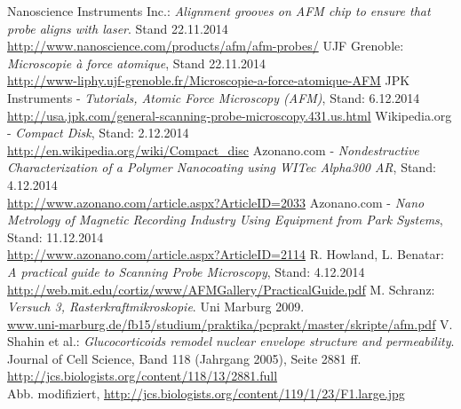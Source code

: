 \documentclass[a4paper, parskip=half, 12pt, bibliography=totocnumbered]{scrartcl}
\begin{document}





\begin{thebibliography}{10}
 Nanoscience Instruments Inc.: \emph{Alignment grooves on AFM chip to ensure that probe aligns with laser}. Stand 22.11.2014\\
\url{http://www.nanoscience.com/products/afm/afm-probes/}
 UJF Grenoble: \emph{Microscopie à force atomique}, Stand 22.11.2014\\
\url{http://www-liphy.ujf-grenoble.fr/Microscopie-a-force-atomique-AFM}
 JPK Instruments - \emph{Tutorials, Atomic Force Microscopy (AFM)}, Stand: 6.12.2014\\
\url{http://usa.jpk.com/general-scanning-probe-microscopy.431.us.html}
 Wikipedia.org - \emph{Compact Disk}, Stand: 2.12.2014\\
\url{http://en.wikipedia.org/wiki/Compact_disc}
 Azonano.com - \emph{Nondestructive Characterization of a Polymer Nanocoating using WITec Alpha300 AR}, Stand: 4.12.2014\\
\url{http://www.azonano.com/article.aspx?ArticleID=2033}
 Azonano.com - \emph{Nano Metrology of Magnetic Recording Industry Using Equipment from Park Systems}, Stand: 11.12.2014\\
\url{http://www.azonano.com/article.aspx?ArticleID=2114}
 R. Howland, L. Benatar: \emph{A practical guide to Scanning Probe Microscopy}, Stand: 4.12.2014\\
\url{http://web.mit.edu/cortiz/www/AFMGallery/PracticalGuide.pdf}
 M. Schranz: \emph{Versuch 3, Rasterkraftmikroskopie}. Uni Marburg 2009.\\
\mbox{\url{www.uni-marburg.de/fb15/studium/praktika/pcprakt/master/skripte/afm.pdf}}
 V. Shahin et al.: \emph{Glucocorticoids remodel nuclear envelope structure and permeability}.\\
Journal of Cell Science, Band 118 (Jahrgang 2005), Seite 2881 ff.\\
\url{http://jcs.biologists.org/content/118/13/2881.full} \\
Abb. modifiziert, \mbox{\url{http://jcs.biologists.org/content/119/1/23/F1.large.jpg}}

\end{thebibliography}
\end{document}
